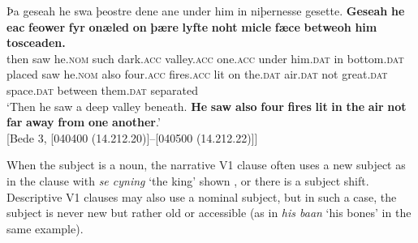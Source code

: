 \documentclass[output=paper,colorlinks,citecolor=brown]{langscibook}
\begin{document}
\ea%
\label{ex:cichosz:19}
\gll Þa   geseah   he     swa   þeostre     dene     ane
under   him     in   niþernesse   gesette.   \textbf{Geseah}   \textbf{he}
\textbf{eac}   \textbf{feower}     \textbf{fyr}     \textbf{onæled}   \textbf{on}   \textbf{þære}     \textbf{lyfte}
\textbf{noht}   \textbf{micle}     \textbf{fæce}     \textbf{betweoh}   \textbf{him}     \textbf{tosceaden.} \\
then  saw  he.\textsc{nom}  such  dark.\textsc{acc}  valley.\textsc{acc}  one.\textsc{acc}
under  him.\textsc{dat}  in  bottom.\textsc{dat}  placed    saw    he.\textsc{nom}
also  four.\textsc{acc}  fires.\textsc{acc}  lit    on   the.\textsc{dat}  air.\textsc{dat}
not   great.\textsc{dat}  space.\textsc{dat}  between  them.\textsc{dat}  separated\\
\glt ‘Then he saw a deep valley beneath. \textbf{He} \textbf{saw} \textbf{also} \textbf{four} \textbf{fires} \textbf{lit} \textbf{in} \textbf{the} \textbf{air} \textbf{not} \textbf{far} \textbf{away} \textbf{from} \textbf{one} \textbf{another}.' \\ \hfill [Bede 3, [040400 (14.212.20)]{}--[040500 (14.212.22)]]
\z 

When the subject is a noun, the narrative V1 clause often uses a new subject as in the clause with \textit{se cyning} ‘the king' shown , or there is a subject shift. Descriptive V1 clauses may also use a nominal subject, but in such a case, the subject is never new but rather old or accessible (as in \textit{his baan} ‘his bones' in the same example).

\ea%
\label{ex:cichosz:20}
\end{document}
